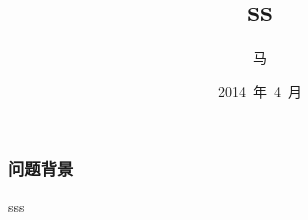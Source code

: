 \documentclass[mathserif,notheorems]{beamer}
\begin{document}
\title[ss]{ss}
\author[ss]{马}
\date[April, 2014]{2014~年~4~月}
\frame{\titlepage}

\begin{frame}
\frametitle{问题背景}
sss
\end{frame}
\end{document}
